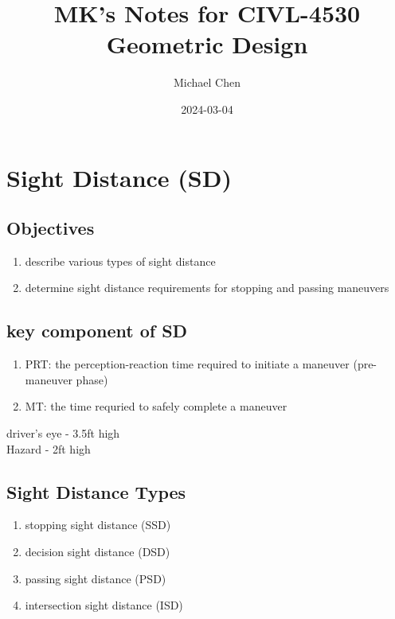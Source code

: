 \documentclass{article}
\title{MK's Notes for CIVL-4530 Geometric Design}
\date{2024-03-04}
\author{Michael Chen}
\begin{document}
  \setcounter{section}{2}


  \section{Sight Distance (SD)}
  \subsection{Objectives}
  \begin{enumerate}
    \item describe various types of sight distance
    \item determine sight distance requirements for stopping and passing maneuvers
  \end{enumerate}

  \subsection{key component of SD}
  \begin{enumerate}
    \item PRT: the perception-reaction time required to initiate a maneuver (pre-maneuver phase)
    \item MT: the time requried to safely complete a maneuver
  \end{enumerate}
  driver's eye - 3.5ft high\\
  Hazard - 2ft high \\


  \subsection{Sight Distance Types}
  \begin{enumerate}
    \item stopping sight distance (SSD)
    \item decision sight distance (DSD)
    \item passing sight distance (PSD)
    \item intersection sight distance (ISD)
  \end{enumerate}
\end{document}
